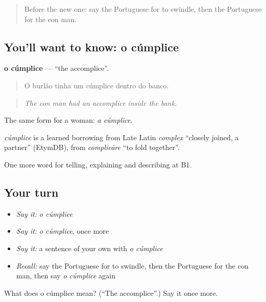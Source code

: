 \label{lesson:PT-C289-cumplice}



\begin{quote}
Before the new one: say the Portuguese for to swindle, then the Portuguese for the con man.
\end{quote}

\subsection*{You'll want to know: o cúmplice}
\textbf{o cúmplice} — \textquotedblleft{}the accomplice\textquotedblright{}.

\begin{quote}
O burlão tinha um cúmplice dentro do banco.
\end{quote}

\begin{quote}
\emph{The con man had an accomplice inside the bank.}
\end{quote}

The same form for a woman: \emph{a cúmplice}.

\begin{cousinweb}
\emph{cúmplice} is a learned borrowing from Late Latin \emph{complex} \textquotedblleft{}closely joined, a partner\textquotedblright{} (EtymDB), from \emph{complicāre} \textquotedblleft{}to fold together\textquotedblright{}.
\end{cousinweb}

\begin{grammarlens}[title={What you've built}]
One more word for telling, explaining and describing at B1.
\end{grammarlens}

\subsection*{Your turn}
\begin{itemize}
\raggedright
  \item \emph{Say it:} \emph{o cúmplice}
  \item \emph{Say it:} \emph{o cúmplice}, once more
  \item \emph{Say it:} a sentence of your own with \emph{o cúmplice}
  \item \emph{Recall:} say the Portuguese for to swindle, then the Portuguese for the con man, then say \emph{o cúmplice} again
\end{itemize}

\begin{tcolorbox}[breakable,colback=teal!4,colframe=teal!35!black,title={Before you move on}]
What does o cúmplice mean? (\textquotedblleft{}The accomplice\textquotedblright{}.) Say it once more.
\end{tcolorbox}
